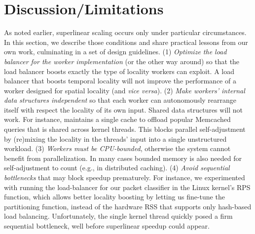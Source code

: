\section{Discussion/Limitations}
As noted earlier, superlinear scaling occurs only under particular circumstances. In this section, we describe those conditions and share practical lessons from our own work, culminating in a set of design guidelines.
(1) \emph{Optimize the load balancer for the worker implementation} (or the other way around) so that the load balancer boosts exactly the type of locality workers can exploit. A load balancer that boosts temporal locality will not improve the performance of a worker designed for spatial locality (and \emph{vice versa}). (2) \emph{Make workers' internal data structures independent} so that each worker can autonomously rearrange itself with respect the locality of its own input. Shared data structures will not work. For instance, \cite{ghigoff2021bmc} maintains a single cache to offload popular Memcached queries that is shared across kernel threads. This blocks parallel self-adjustment by (re)mixing the locality in the threads' input into a single unstructured workload. (3) \emph{Workers must be CPU-bounded}, otherwise the system cannot benefit from parallelization. In many cases bounded memory is also needed for self-adjustment to count (e.g., in distributed caching). (4) \emph{Avoid sequential bottlenecks} that may block speedup prematurely. For instance, we experimented with running the load-balancer for our packet classifier in the Linux kernel's RPS function, which allows better locality boosting by letting us fine-tune the partitioning function, instead of the hardware RSS that supports only hash-based load balancing. Unfortunately, the single kernel thread quickly posed a firm sequential bottleneck, well before superlinear speedup could appear.
